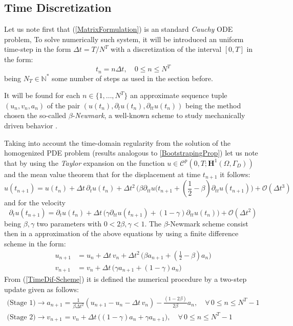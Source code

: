 \subsection{Time Discretization}
Let us note first that (\ref{MatrixFormulation}) is an standard \textit{Cauchy} ODE problem, To solve numerically such system, it will be introduced an uniform time-step in the form $\Delta t = T/N^T$ with a discretization of the interval $[0, T]$ in the form:
\begin{equation*}
    t_n = n \Delta t, \quad 0 \leq n \leq N^T
\end{equation*}
being $N_T \in \mathbb{N}^*$ some number of steps as used in the section before.

It will be found for each $n \in \{1,\dots, N^T \}$ an approximate sequence tuple $(u_n, v_n, a_n)$ of the pair $(u(t_n), \partial_{t} u(t_n), \partial_{tt} u(t_n))$ being the method chosen the so-called $\beta$-\textit{Newmark}, a well-known scheme to study mechanically driven behavior \cite{raviart1983introduction}.

Taking into account the time-domain regularity from the solution of the homogenized PDE problem (results analogous to \ref{BootstrapingProp}) let us note that by using the \textit{Taylor} expansion on the function $u \in \mathcal{C}^{p}(0,T;\mathbf{H}^1(\Omega, \Gamma_D))$ and the mean value theorem that for the displacement at time $t_{n+1}$ it follows:
\begin{equation*}
    u(t_{n+1}) = u(t_n) + \Delta t \, \partial_{t} u(t_n) + \Delta t^2 \, \big( \beta \partial_{tt} u(t_{n+1} + (\frac{1}{2} - \beta) \partial_{tt} u(t_{n+1}) \big) + \mathcal{O}(\Delta t^3)    
\end{equation*}
and for the velocity
\begin{equation*}
    \partial_{t} u(t_{n+1}) = \partial_{t} u (t_{n}) + \Delta t \, \big( \gamma \partial_{tt} u(t_{n+1}) + (1-\gamma) \partial_{tt} u(t_n) \big) + \mathcal{O}(\Delta t^2)
\end{equation*}
being $\beta, \gamma$ two parameters with $0 < 2\beta, \gamma < 1$.
The $\beta$-Newmark scheme consist then in a approximation of the above equations by using a finite difference scheme in the form:
\begin{align}
    \label{TimeDif-Scheme}
    u_{n+1} &= u_{n} + \Delta t\, v_{n} + \Delta t^2 \, \big( \beta a_{n+1} + (\frac{1}{2} - \beta) a_n \big) \\
    v_{n+1} &= v_n + \Delta t\, \big( \gamma a_{n+1} + (1-\gamma) a_{n} \big)
\end{align}
From (\ref{TimeDif-Scheme}) it is defined the numerical procedure by a two-step update given as follows:
\begin{align}
    \label{TwoStage-Update}
    \text{(Stage 1)}\longrightarrow  a_{n+1} &= \frac{1}{\beta \Delta t^2} ( u_{n+1}-u_n - \Delta t \, v_n) - \frac{(1-2\beta)}{2 \beta} a_n, \quad \forall \, 0 \leq n \leq N^T-1 \\
    \text{(Stage 2)}\longrightarrow v_{n+1} &= v_n + \Delta t \, \big( (1-\gamma) a_n + \gamma a_{n+1} \big), \quad \forall \, 0 \leq n \leq N^T-1
\end{align}

